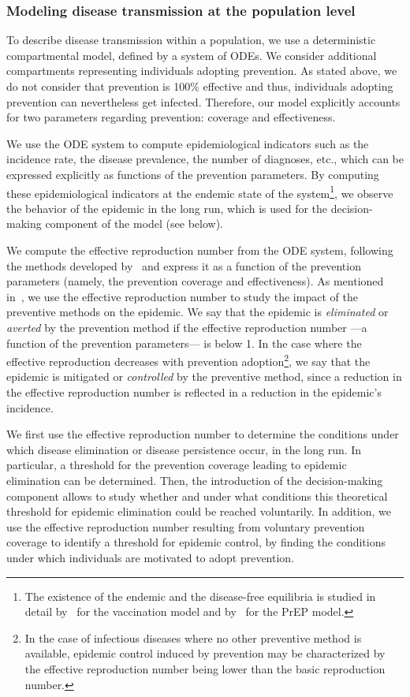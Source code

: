 \subsubsection{Modeling disease transmission at the population level}
To describe disease transmission within a population, we use a deterministic compartmental model, defined by a system of ODEs. We consider additional compartments representing individuals adopting prevention. As stated above, we do not consider that prevention is 100\% effective and thus, individuals adopting prevention can nevertheless get infected. Therefore, our model explicitly accounts for two parameters regarding prevention: coverage and effectiveness.

We use the ODE system to compute epidemiological indicators such as the incidence rate, the disease prevalence, the number of diagnoses, etc., which can be expressed explicitly as functions of the prevention parameters. By computing these epidemiological indicators at the endemic state of the system\footnote{The existence of the endemic and the disease-free equilibria is studied in detail by~\citet{Hethcote2000} for the vaccination model and by~\citet{Jacquez1988} for the PrEP model.}, we observe the behavior of the epidemic in the long run, which is used for the decision-making component of the model (see below). 

We compute the effective reproduction number from the ODE system, following the methods developed by~\citet{VanDenDriessche2002} and express it as a function of the prevention parameters (namely, the prevention coverage and effectiveness). As mentioned in~, we use the effective reproduction number to study the impact of the preventive methods on the epidemic. We say that the epidemic is \textit{eliminated} or \textit{averted} by the prevention method if the effective reproduction number ---a function of the prevention parameters--- is below 1. In the case where the effective reproduction decreases with prevention adoption\footnote{In the case of infectious diseases where no other preventive method is available, epidemic control induced by prevention may be characterized by the effective reproduction number being lower than the basic reproduction number.}, we say that the epidemic is mitigated or \textit{controlled} by the preventive method, since a reduction in the effective reproduction number is reflected in a reduction in the epidemic's incidence.

We first use the effective reproduction number to determine the conditions under which disease elimination or disease persistence occur, in the long run. In particular, a threshold for the prevention coverage leading to epidemic elimination can be determined. Then, the introduction of the decision-making component allows to study whether and under what conditions this theoretical threshold for epidemic elimination could be reached voluntarily. In addition, we use the effective reproduction number resulting from voluntary prevention coverage to identify a threshold for epidemic control, by finding the conditions under which individuals are motivated to adopt prevention.

